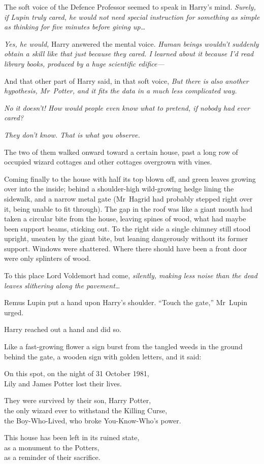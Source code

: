 The soft voice of the Defence Professor seemed to speak in Harry’s mind.
\emph{Surely, if Lupin truly cared, he would not need special instruction for
something as simple as thinking for five minutes before giving up…}

\emph{Yes, he would,} Harry answered the mental voice. \emph{Human beings
wouldn’t suddenly obtain a skill like that just because they cared. I learned
about it because I’d read library books, produced by a huge scientific
edifice—}

And that other part of Harry said, in that soft voice, \emph{But there is also
another hypothesis, Mr~Potter, and it fits the data in a much less complicated
way.}

\emph{No it doesn’t! How would people even know what to pretend, if nobody had
ever cared?}

\emph{They don’t know. That is what you observe.}

The two of them walked onward toward a certain house, past a long row of
occupied wizard cottages and other cottages overgrown with vines.

Coming finally to the house with half its top blown off, and green leaves
growing over into the inside; behind a shoulder-high wild-growing hedge lining
the sidewalk, and a narrow metal gate (Mr~Hagrid had probably stepped right
over it, being unable to fit through). The gap in the roof was like a giant
mouth had taken a circular bite from the house, leaving spines of wood, what
had maybe been support beams, sticking out. To the right side a single chimney
still stood upright, uneaten by the giant bite, but leaning dangerously without
its former support. Windows were shattered. Where there should have been a
front door were only splinters of wood.

To this place Lord Voldemort had come, \emph{silently, making less noise than
the dead leaves slithering along the pavement…}

Remus Lupin put a hand upon Harry’s shoulder. “Touch the gate,” Mr~Lupin urged.

Harry reached out a hand and did so.

Like a fast-growing flower a sign burst from the tangled weeds in the ground
behind the gate, a wooden sign with golden letters, and it said:

\begin{center}
On this spot, on the night of 31 October 1981,\\
Lily and James Potter lost their lives.

They were survived by their son, Harry Potter,\\
the only wizard ever to withstand the Killing Curse,\\
the Boy-Who-Lived, who broke You-Know-Who’s power.

This house has been left in its ruined state,\\
as a monument to the Potters,\\
as a reminder of their sacrifice.
\end{center}

